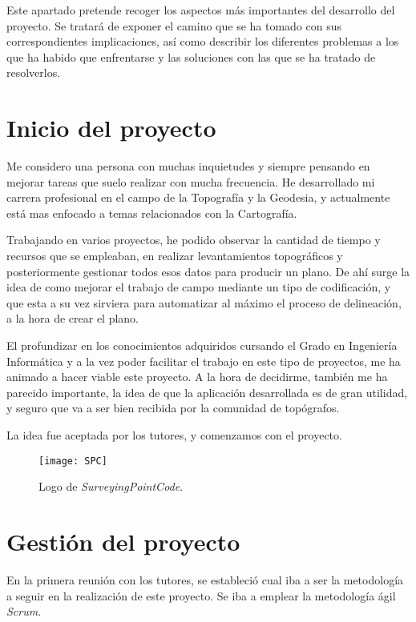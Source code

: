 
Este apartado pretende recoger los aspectos más importantes del desarrollo del proyecto. Se tratará de exponer el camino que se ha tomado con sus correspondientes implicaciones, así como describir los diferentes problemas a
los que ha habido que enfrentarse y las soluciones con las que se ha tratado de resolverlos.

\section{Inicio del proyecto}

Me considero una persona con muchas inquietudes y siempre pensando en mejorar tareas que suelo realizar con mucha frecuencia. He desarrollado mi carrera profesional en el campo de la Topografía y la Geodesia, y actualmente está mas enfocado a temas relacionados con la Cartografía.

Trabajando en varios proyectos, he podido observar la cantidad de tiempo y recursos que se empleaban, en realizar levantamientos topográficos y posteriormente gestionar todos esos datos para producir un plano. De ahí surge la idea de como mejorar el trabajo de campo mediante un tipo de codificación,  y que esta a su vez sirviera para automatizar al máximo el proceso de delineación, a la hora de  crear el plano.

El profundizar en los conocimientos adquiridos cursando el Grado en Ingeniería Informática y a la vez poder facilitar el trabajo en este tipo de proyectos, me ha animado a hacer viable este proyecto. A la hora de decidirme, también me ha parecido importante, la idea de que la aplicación desarrollada es de gran utilidad, y seguro que va a ser bien recibida por la comunidad de topógrafos.

La idea fue aceptada por los tutores, y comenzamos con el proyecto.

\begin{figure}[!h]
	\centering
	\texttt{[image: SPC]}
	\caption{Logo de \emph{SurveyingPointCode}.}
	\label{fig:SPC}
\end{figure}


\section{Gestión del proyecto}

En la primera reunión con los tutores, se estableció cual iba a ser la metodología a seguir en la realización de este proyecto. Se iba a emplear la metodología ágil \emph{Scrum}.


